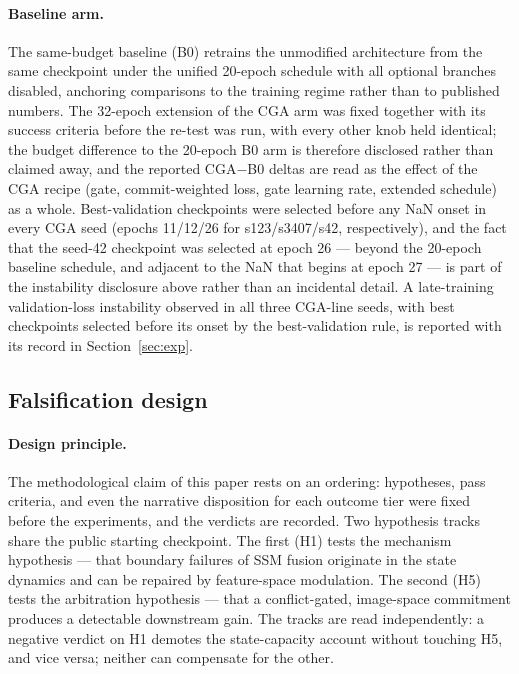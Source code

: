 \documentclass[pdflatex,sn-mathphys-num]{sn-jnl}
\theoremstyle{thmstyleone}%
\theoremstyle{thmstyletwo}%
\theoremstyle{thmstylethree}%
\begin{document}
\paragraph{Baseline arm.}
The same-budget baseline (B0) retrains the unmodified architecture from the same checkpoint under the unified 20-epoch schedule with all optional branches disabled, anchoring comparisons to the training regime rather than to published numbers. The 32-epoch extension of the CGA arm was fixed together with its success criteria before the re-test was run, with every other knob held identical; the budget difference to the 20-epoch B0 arm is therefore disclosed rather than claimed away, and the reported CGA$-$B0 deltas are read as the effect of the CGA recipe (gate, commit-weighted loss, gate learning rate, extended schedule) as a whole. Best-validation checkpoints were selected before any NaN onset in every CGA seed (epochs 11/12/26 for s123/s3407/s42, respectively), and the fact that the seed-42 checkpoint was selected at epoch 26 --- beyond the 20-epoch baseline schedule, and adjacent to the NaN that begins at epoch 27 --- is part of the instability disclosure above rather than an incidental detail. A late-training validation-loss instability observed in all three CGA-line seeds, with best checkpoints selected before its onset by the best-validation rule, is reported with its record in Section~\ref{sec:exp}.

\subsection{Falsification design}\label{sec:methods:design}

\paragraph{Design principle.}
The methodological claim of this paper rests on an ordering: hypotheses, pass criteria, and even the narrative disposition for each outcome tier were fixed before the experiments, and the verdicts are recorded. Two hypothesis tracks share the public starting checkpoint. The first (H1) tests the mechanism hypothesis --- that boundary failures of SSM fusion originate in the state dynamics and can be repaired by feature-space modulation. The second (H5) tests the arbitration hypothesis --- that a conflict-gated, image-space commitment produces a detectable downstream gain. The tracks are read independently: a negative verdict on H1 demotes the state-capacity account without touching H5, and vice versa; neither can compensate for the other.
\end{document}
